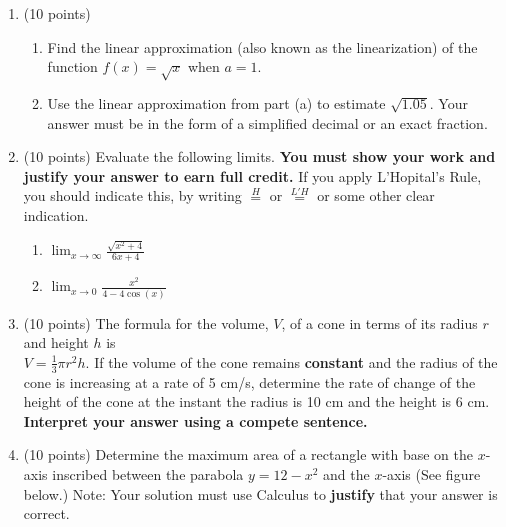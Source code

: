 \documentclass[12pt]{article}
\renewcommand{\emph}[1]{\textsf{\textbf{#1}}}
\begin{document}
\newpage
\begin{enumerate}
\item (10 points)%
	\begin{enumerate}
	\item Find the linear approximation (also known as the linearization) of the function $f(x)=\sqrt{x}$ when $a=1.$
	\vfill
	\item Use the linear approximation from part (a) to estimate $\sqrt{1.05}$. Your answer must be in the form of a simplified decimal or an exact fraction.
	\vfill
	\end{enumerate}

\item (10 points) Evaluate the following limits. \textbf{You must show your work and justify your answer to earn full credit.} If you apply L'Hopital's Rule, you should indicate this, by writing $\overset{H}{=}$ or $\overset{L'H}{=}$ or some other clear indication.
	\begin{enumerate}
	\item $\displaystyle{\lim_{x \to \infty} \frac{\sqrt{x^2+4}}{6x+4}}$ 
	\vfill
	\item $\displaystyle{\lim_{x\to 0} \frac{x^2}{4-4\cos(x)}}$
	\vfill
	\end{enumerate}
	

\newpage

\item (10 points) The formula for the volume, $V$, of a cone in terms of its radius $r$ and height $h$ is \\$V=\frac{1}{3} \pi r^2 h.$ 
If the volume of the cone remains {\bf constant} and the radius of the cone is increasing at a rate of 5 cm/s, determine the rate of change of the height of the cone at the instant the radius is 10 cm and the height is 6 cm. \textbf{Interpret your answer using a compete sentence.} 
\newpage


\item (10 points) Determine the maximum area of a rectangle with base on the $x$-axis inscribed between the parabola $y=12-x^2$ and the $x$-axis (See figure below.) 
Note: Your solution must use Calculus to \emph{justify} that your answer is correct.\\


\end{enumerate}
\end{document}
